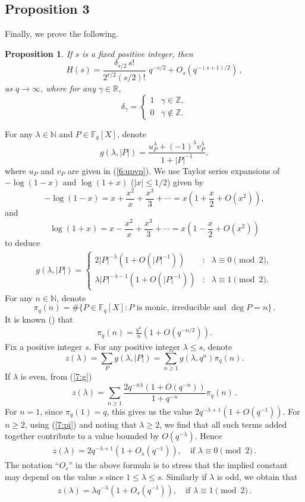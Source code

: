 \documentclass[12pt]{amsart}
\theoremstyle{plain}
\newtheorem{prop}{Proposition}
\newcommand{\Z}{{\mathbb Z}}
\newcommand{\N}{{\mathbb N}}
\newcommand{\R}{{\mathbb R}}
\newcommand{\F}{{\mathbb F}_q}
\begin{document}
\subsection{Proposition 3} Finally, we prove the following.
\begin{prop} \label{6:lem4} If $s$ is a fixed positive integer, then \[H(s) = \frac{\delta_{s/2}\, s!}{2^{r/2} (s/2)!} \,\, q^{-s/2}+O_s\left(q^{-(s+1)/2}\right)\,,\]
as $q \to \infty$, where for any $\gamma \in \R$,
\[\delta_{\gamma}=\left\{\begin{array}{cc}1&\gamma \in \Z,\\
0& \gamma \not \in \Z.\end{array}\right.\]
\end{prop}
 For any $\lambda \in \N$ and $P \in \F[X]$, denote
\[g(\lambda,|P|)= \frac{u_P^{\lambda}+(-1)^{\lambda}v_P^{\lambda}}{1+|P|^{-1}}, \]
where $u_P$ and $v_P$ are given in (\ref{6:upvp}). We use Taylor series expansions of $-\log (1-x)$ and $\log (1+x)$ ($|x| \le 1/2$) given by
\[-\log (1-x)=x+\frac{x^2}{x}+\frac{x^3}{3}+\cdots=x\left(1+\frac{x}{2}+O(x^2)\right),\]
and
\[\log (1+x)=x-\frac{x^2}{x}+\frac{x^3}{3}+\cdots=x\left(1-\frac{x}{2}+O(x^2)\right)\]
to deduce
\begin{eqnarray} \label{7:g} g(\lambda,|P|)=\left\{\begin{array}{ccc} 2|P|^{-\lambda} \left(1+O\left(|P|^{-1}\right)\right)&:&\lambda \equiv 0 \pmod{2},\\
\lambda|P|^{-\lambda-1} \left(1+O\left(|P|^{-1}\right)\right)&:&\lambda \equiv 1 \pmod{2}.\end{array}\right.\end{eqnarray}
For any $n \in \N$, denote
\[\pi_q(n)=\#\{P \in \F[X]: P \mbox{ is monic, irreducible and } \deg P=n\}\,.\]
It is known (\cite{ros}) that
\begin{eqnarray} \label{7:pi} \pi_q(n)=\frac{q^n}{n} \left(1+O(q^{-n/2})\right). \end{eqnarray}
Fix a positive integer $s$. For any positive integer $\lambda \le s$, denote
\[z(\lambda)=\sum_{P}g(\lambda,|P|)=\sum_{n \ge 1}g(\lambda,q^n) \pi_q(n).\]
If $\lambda$ is even, from (\ref{7:g})
\[z(\lambda)=\sum_{n \ge 1}\frac{2q^{-n \lambda} \left(1+O(q^{-n})\right)}{1+q^{-n}} \pi_q(n)\,.\]
For $n=1$, since $\pi_q(1)=q$, this gives us the value $2q^{-\lambda+1} \left(1+O(q^{-1})\right)$. For $n \ge 2$, using (\ref{7:pi}) and noting that $\lambda \ge 2$, we find that all such terms added together contribute to a value bounded by $O(q^{-\lambda})$. Hence
\begin{eqnarray} \label{7:ze} z(\lambda)=2q^{-\lambda+1} \left(1+O_s(q^{-1})\right), \quad \mbox{if } \lambda \equiv 0 \pmod{2}\,.\end{eqnarray}
The notation ``$O_s$'' in the above formula is to stress that the implied constant may depend on the value $s$ since $1 \le \lambda \le s$. Similarly if $\lambda$ is odd, we obtain that
\begin{eqnarray} \label{7:zo} z(\lambda)=\lambda q^{-\lambda}\left(1+O_s(q^{-1})\right), \quad \mbox{if } \lambda \equiv 1 \pmod{2}\,.\end{eqnarray}
\end{document}
